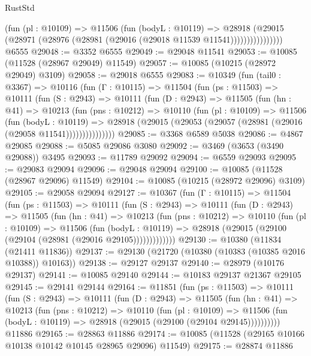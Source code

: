 \begin{lexlean}{RustStd}
\begin{coremodule}
                    (fun (pl : @10109) =>
                    @11506
                      (fun (bodyL : @10119) =>
                      @28918
                        (@29015
                          (@28971 (@28976 (@28981 (@29016 (@29018 @11539 @11541))))))))))))))))
    @6555
@29048 := @3352 @6555
@29049 := @29048 @11541
@29053 := @10085 (@11528 (@28967 @29049) @11549)
@29057 := @10085 (@10215 (@28972 @29049) @3109)
@29058 := @29018 @6555
@29083 := @10349
    (fun (tail0 : @3367) =>
    @10116
      (fun (Γ : @10115) =>
      @11504
        (fun (ps : @11503) =>
        @10111
          (fun (S : @2943) =>
          @10111
            (fun (D : @2943) =>
            @11505
              (fun (hn : @41) =>
              @10213
                (fun (pns : @10212) =>
                @10110
                  (fun (pl : @10109) =>
                  @11506
                    (fun (bodyL : @10119) =>
                    @28918 (@29015 (@29053 (@29057 (@28981 (@29016 (@29058 @11541)))))))))))))))
@29085 := @3368 @6589 @5038
@29086 := @4867 @29085
@29088 := @5085 @29086 @3080
@29092 := @3469 (@3653 (@3490 @29088)) @3495
@29093 := @11789 @29092
@29094 := @6559 @29093
@29095 := @29083 @29094
@29096 := @29048 @29094
@29100 := @10085 (@11528 (@28967 @29096) @11549)
@29104 := @10085 (@10215 (@28972 @29096) @3109)
@29105 := @29058 @29094
@29127 := @10367
    (fun (Γ : @10115) =>
    @11504
      (fun (ps : @11503) =>
      @10111
        (fun (S : @2943) =>
        @10111
          (fun (D : @2943) =>
          @11505
            (fun (hn : @41) =>
            @10213
              (fun (pns : @10212) =>
              @10110
                (fun (pl : @10109) =>
                @11506
                  (fun (bodyL : @10119) =>
                  @28918 (@29015 (@29100 (@29104 (@28981 (@29016 @29105)))))))))))))
@29130 := @10380 (@11834 (@21411 @11836))
@29137 := @29130 (@21720 (@10380 (@10383 (@10385 @2016 @10388)) @10163))
@29138 := @29127 @29137
@29140 := @28979 (@10176 @29137)
@29141 := @10085 @29140
@29144 := @10183 @29137 @21367 @29105
@29145 := @29141 @29144
@29164 := @11851
    (fun (ps : @11503) =>
    @10111
      (fun (S : @2943) =>
      @10111
        (fun (D : @2943) =>
        @11505
          (fun (hn : @41) =>
          @10213
            (fun (pns : @10212) =>
            @10110
              (fun (pl : @10109) =>
              @11506 (fun (bodyL : @10119) => @28918 (@29015 (@29100 (@29104 @29145))))))))))
    @11886
@29165 := @28863 @11886
@29174 := @10085 (@11528 (@29165 @10166 @10138 @10142 @10145 @28965 @29096) @11549)
@29175 := @28874 @11886

\end{coremodule}
\end{lexlean}
